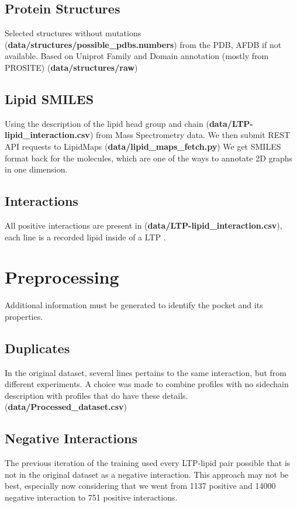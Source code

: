\documentclass{pssbmac}
\begin{document}
\subsection{Protein Structures}
Selected structures without mutations (\textbf{data/structures/possible\_pdbs.numbers}) from the PDB, AFDB if not available. Based on Uniprot Family and Domain annotation (mostly from PROSITE) (\textbf{data/structures/raw})

\subsection{Lipid SMILES}
Using the description of the lipid head group and chain (\textbf{data/LTP-lipid\_interaction.csv}) from Mass Spectrometry data. We then submit REST API requests to LipidMaps (\textbf{data/lipid\_maps\_fetch.py})  We get SMILES format back for the molecules, which are one of the ways to annotate 2D graphs in one dimension. \cite{lipidmaps}

\subsection{Interactions}
All positive interactions are present in (\textbf{data/LTP-lipid\_interaction.csv}), each line is a recorded lipid inside of a LTP \cite{acg}.

\section{Preprocessing}

Additional information must be generated to identify the pocket and its properties.

\subsection{Duplicates}

In the original dataset, several lines pertains to the same interaction, but from different experiments. A choice was made to combine profiles with no sidechain description with profiles that do have these details. (\textbf{data/Processed\_dataset.csv})

\subsection{Negative Interactions}
The previous iteration of the training used every LTP-lipid pair possible that is not in the original dataset as a negative interaction. This approach may not be best, especially now considering that we went from 1137 positive and 14000 negative interaction to 751 positive interactions.
\end{document}
